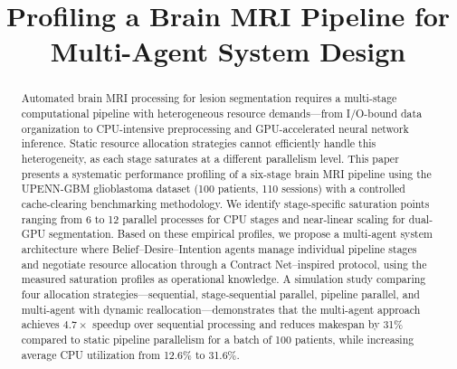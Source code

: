 \documentclass[conference]{IEEEtran}
\begin{document}
\title{Profiling a Brain MRI Pipeline for Multi-Agent System Design}

\author{
\and
{}
\and
{}
}

\maketitle

\begin{abstract}
Automated brain MRI processing for lesion segmentation requires a multi-stage computational pipeline with heterogeneous resource demands---from I/O-bound data organization to CPU-intensive preprocessing and GPU-accelerated neural network inference. Static resource allocation strategies cannot efficiently handle this heterogeneity, as each stage saturates at a different parallelism level. This paper presents a systematic performance profiling of a six-stage brain MRI pipeline using the UPENN-GBM glioblastoma dataset (100 patients, 110 sessions) with a controlled cache-clearing benchmarking methodology. We identify stage-specific saturation points ranging from 6 to 12 parallel processes for CPU stages and near-linear scaling for dual-GPU segmentation. Based on these empirical profiles, we propose a multi-agent system architecture where Belief--Desire--Intention agents manage individual pipeline stages and negotiate resource allocation through a Contract Net--inspired protocol, using the measured saturation profiles as operational knowledge. A simulation study comparing four allocation strategies---sequential, stage-sequential parallel, pipeline parallel, and multi-agent with dynamic reallocation---demonstrates that the multi-agent approach achieves $4.7\times$ speedup over sequential processing and reduces makespan by 31\% compared to static pipeline parallelism for a batch of 100 patients, while increasing average CPU utilization from 12.6\% to 31.6\%.
\end{abstract}
\end{document}
